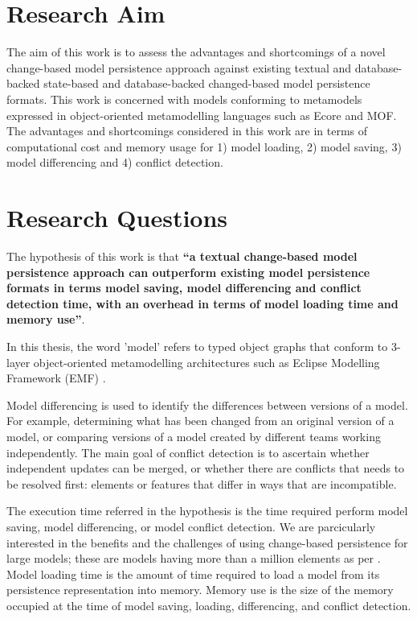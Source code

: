 \section{Research Aim}
\label{sec:research_aim}
The aim of this work is to assess the advantages and shortcomings of a novel change-based model persistence approach against existing textual and database-backed state-based and database-backed changed-based model persistence formats. This work is concerned with models conforming to metamodels expressed in object-oriented metamodelling languages such as Ecore and MOF. The advantages and shortcomings considered in this work are in terms of computational cost and memory usage for 1) model loading, 2) model saving, 3) model differencing and 4) conflict detection.

\section{Research Questions}
\label{sec:research_questions}
The hypothesis of this work is that \textbf{``a textual change-based model persistence approach can outperform existing model persistence formats in terms model saving, model differencing and conflict detection time, with an overhead in terms of model loading time and memory use''}. 

In this thesis, the word 'model' refers to typed object graphs that conform to 3-layer object-oriented metamodelling architectures such as Eclipse Modelling Framework (EMF) \cite{eclipse2019emf}. 

Model differencing is used to identify the differences between versions of a model. For example, determining what has been changed from an original version of a model, or comparing versions of a model created by different teams working independently. The main goal of conflict detection is to ascertain whether independent updates can be merged, or whether there are conflicts that needs to be resolved first: elements or features that differ in ways that are incompatible. 

The execution time referred in the hypothesis is the time required perform model saving, model differencing, or model conflict detection. We are parcicularly interested in the benefits and the challenges of using change-based persistence for large models; these are models having more than a million elements as per \cite{daniel2016neoemf,DBLP:conf/models/Espinazo-PaganCM11}. Model loading time is the amount of time required to load a model from its persistence representation into memory. Memory use is the size of the memory occupied at the time of model saving, loading, differencing, and conflict detection.


